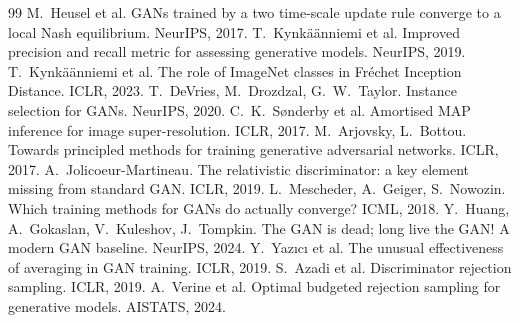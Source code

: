 \begin{thebibliography}{99}\setlength{\itemsep}{0pt}
 M.~Heusel et al. GANs trained by a two time-scale update rule converge to a local Nash equilibrium. NeurIPS, 2017.
 T.~Kynkäänniemi et al. Improved precision and recall metric for assessing generative models. NeurIPS, 2019.
 T.~Kynkäänniemi et al. The role of ImageNet classes in Fréchet Inception Distance. ICLR, 2023.
 T.~DeVries, M.~Drozdzal, G.~W.~Taylor. Instance selection for GANs. NeurIPS, 2020.
 C.~K.~Sønderby et al. Amortised MAP inference for image super-resolution. ICLR, 2017.
 M.~Arjovsky, L.~Bottou. Towards principled methods for training generative adversarial networks. ICLR, 2017.
 A.~Jolicoeur-Martineau. The relativistic discriminator: a key element missing from standard GAN. ICLR, 2019.
 L.~Mescheder, A.~Geiger, S.~Nowozin. Which training methods for GANs do actually converge? ICML, 2018.
 Y.~Huang, A.~Gokaslan, V.~Kuleshov, J.~Tompkin. The GAN is dead; long live the GAN! A modern GAN baseline. NeurIPS, 2024.
 Y.~Yazıcı et al. The unusual effectiveness of averaging in GAN training. ICLR, 2019.
 S.~Azadi et al. Discriminator rejection sampling. ICLR, 2019.
 A.~Verine et al. Optimal budgeted rejection sampling for generative models. AISTATS, 2024.
\end{thebibliography}
